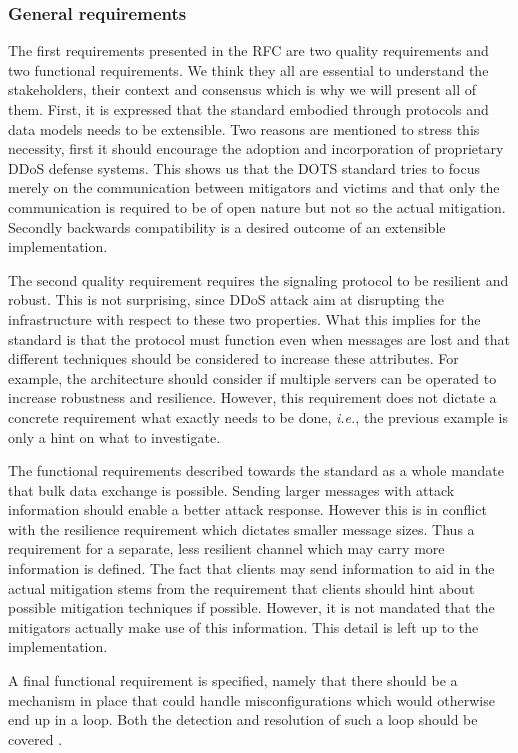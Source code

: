 \subsubsection{General requirements}
The first requirements presented in the RFC are two quality requirements and two functional requirements. We think they all are essential to understand the stakeholders, their context and consensus which is why we will present all of them.
First, it is expressed that the standard embodied through protocols and data models needs to be extensible. Two reasons are mentioned to stress this necessity, first it should encourage the adoption and incorporation of proprietary DDoS defense systems. This shows us that the DOTS standard tries to focus merely on the communication between mitigators and victims and that only the communication is required to be of open nature but not so the actual mitigation. Secondly backwards compatibility is a desired outcome of an extensible implementation.

The second quality requirement requires the signaling protocol to be resilient and robust. This is not surprising, since DDoS attack aim at disrupting the infrastructure with respect to these two properties. What this implies for the standard is that the protocol must function even when messages are lost and that different techniques should be considered to increase these attributes. For example, the architecture should consider if multiple servers can be operated to increase robustness and resilience. However, this requirement does not dictate a concrete requirement what exactly needs to be done, \emph{i.e.}, the previous example is only a hint on what to investigate.

The functional requirements described towards the standard as a whole mandate that bulk data exchange is possible. Sending larger messages with attack information should enable a better attack response. However this is in conflict with the resilience requirement which dictates smaller message sizes. Thus a requirement for a separate, less resilient channel which may carry more information is defined. The fact that clients may send information to aid in the actual mitigation stems from the requirement that clients should hint about possible mitigation techniques if possible. However, it is not mandated that the mitigators actually make use of this information. This detail is left up to the implementation.

A final functional requirement is specified, namely that there should be a mechanism in place that could handle misconfigurations which would otherwise end up in a loop. Both the detection and resolution of such a loop should be covered \cite{rfc8612}.

